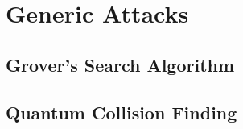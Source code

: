 \section{Generic Attacks}
  \subsection{Grover's Search Algorithm}
  \subsection{Quantum Collision Finding}
